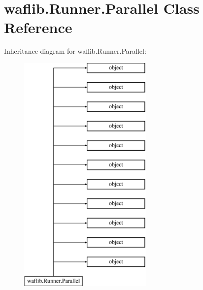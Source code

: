 \hypertarget{classwaflib_1_1_runner_1_1_parallel}{}\section{waflib.\+Runner.\+Parallel Class Reference}
\label{classwaflib_1_1_runner_1_1_parallel}
Inheritance diagram for waflib.\+Runner.\+Parallel\+:\begin{figure}[H]
\begin{center}
\leavevmode
\includegraphics[height=12.000000cm]{classwaflib_1_1_runner_1_1_parallel}
\end{center}
\end{figure}
